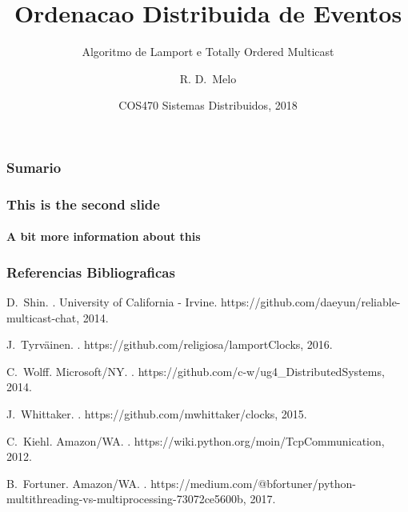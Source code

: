 \documentclass{beamer}
\title[Ordenacao Distribuida] %
    {Ordenacao Distribuida de Eventos}
\subtitle{Algoritmo de Lamport e Totally Ordered Multicast}
\author[Melo] %
    {R. D.~Melo\inst{1}}
\institute[Universidade Federal do Rio de Janeiro (UFRJ)] %
    {
    \inst{1}%
    Departamento de Engenharia de Computacao e Informacao\\
    ECI/UFRJ
    }
\date[2018] %
    {COS470 Sistemas Distribuidos, 2018}
\begin{document}
        \frame{\titlepage}
        \begin{frame}
            \frametitle{Sumario}
            \tableofcontents[currentsection]
        \end{frame}
        \begin{frame}
            \frametitle{This is the second slide}
            \framesubtitle{A bit more information about this}
        \end{frame}

        \begin{frame}[allowframebreaks]
            \frametitle<presentation>{Referencias Bibliograficas}
            \begin{thebibliography}{10}

                \beamertemplateonlinebibitems
                D.~Shin.
                .
                \newblock University of California - Irvine.
                \newblock https://github.com/daeyun/reliable-multicast-chat, 2014.

                \beamertemplateonlinebibitems
                J.~Tyrväinen.
                .
                \newblock https://github.com/religiosa/lamportClocks, 2016.

                \beamertemplateonlinebibitems
                C.~Wolff.
                \newblock Microsoft/NY.
                .
                \newblock https://github.com/c-w/ug4\_DistributedSystems, 2014.

                \beamertemplateonlinebibitems
                J.~Whittaker.
                .
                \newblock https://github.com/mwhittaker/clocks, 2015.

                \beamertemplateonlinebibitems
                C.~Kiehl.
                \newblock Amazon/WA.
                .
                \newblock https://wiki.python.org/moin/TcpCommunication, 2012.

                \beamertemplateonlinebibitems
                B.~Fortuner.
                \newblock Amazon/WA.
                .
                \newblock https://medium.com/@bfortuner/python-multithreading-vs-multiprocessing-73072ce5600b, 2017.


\end{thebibliography}
\end{frame}
\end{document}
